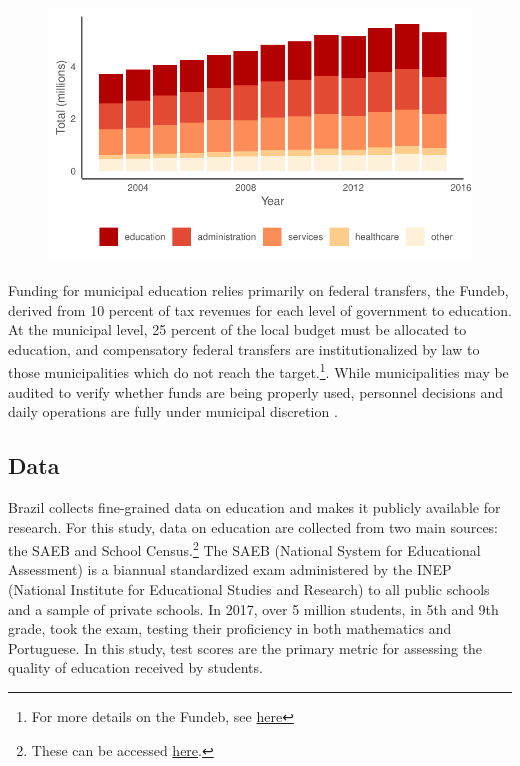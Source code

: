 \documentclass[12pt,a4paper]{article}
\begin{document}
\begin{figure}[h]
    \centering
    \includegraphics{plots/descriptive_staff_breakdown}
\end{figure}

Funding for municipal education relies primarily on federal transfers, the Fundeb, derived from 10 percent of tax revenues for each level of government to education. At the municipal level, 25 percent of the local budget must be allocated to education, and compensatory federal transfers are institutionalized by law to those municipalities which do not reach the target.\footnote{For more details on the Fundeb, see \hyperlink{https://www.fnde.gov.br/index.php/financiamento/fundeb/sobre-o-plano-ou-programa/sobre-o-fundeb}{here}}. While municipalities may be audited to verify whether funds are being properly used, personnel decisions and daily operations are fully under municipal discretion \citet{ferraz_corrupting_2012}.

\subsection{Data}

Brazil collects fine-grained data on education and makes it publicly available for research. For this study, data on education are collected from two main sources: the SAEB and School Census.\footnote{These can be accessed \hyperlink{http://portal.inep.gov.br/web/guest/dados}{here}.} The SAEB (National System for Educational Assessment) is a biannual standardized exam administered by the INEP (National Institute for Educational Studies and Research) to all public schools and a sample of private schools. In 2017, over 5 million students, in 5th and 9th grade, took the exam, testing their proficiency in both mathematics and Portuguese. In this study, test scores are the primary metric for assessing the quality of education received by students.
\end{document}
